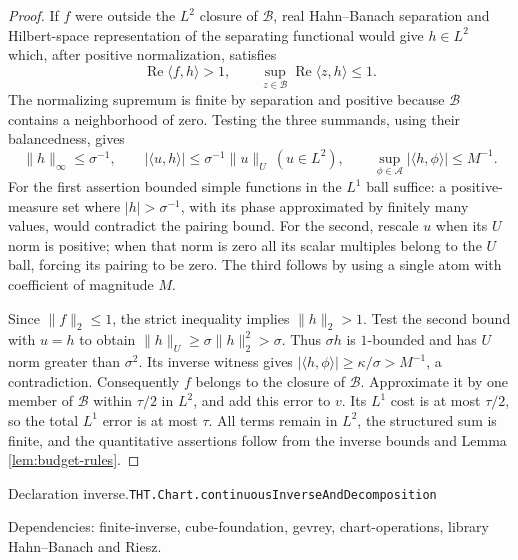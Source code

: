 \documentclass[11pt]{article}
\theoremstyle{definition}
\numberwithin{equation}{section}
\newcommand{\bp}[3]{\par\smallskip\begingroup\footnotesize
\noindent\hypertarget{bp:#1}{\textsf{Declaration #1.}}\quad\nolinkurl{#2}\par
\noindent\textsf{Dependencies:} #3.\par\endgroup\smallskip}
\begin{document}
\begin{proof}
If $f$ were outside the $L^2$ closure of $\mathcal B$, real Hahn--Banach separation and Hilbert-space representation of the separating functional would give $h\in L^2$ which, after positive normalization, satisfies
\[
 \operatorname{Re}\langle f,h\rangle>1,
 \qquad \sup_{z\in\mathcal B}\operatorname{Re}\langle z,h\rangle\le1.
\]
The normalizing supremum is finite by separation and positive because $\mathcal B$ contains a neighborhood of zero. Testing the three summands, using their balancedness, gives
\[
 \|h\|_\infty\le\sigma^{-1},\qquad
 |\langle u,h\rangle|\le\sigma^{-1}\|u\|_U\ (u\in L^2),\qquad
 \sup_{\phi\in\mathcal A}|\langle h,\phi\rangle|\le M^{-1}.
\]
For the first assertion bounded simple functions in the $L^1$ ball suffice: a positive-measure set where $|h|>\sigma^{-1}$, with its phase approximated by finitely many values, would contradict the pairing bound. For the second, rescale $u$ when its $U$ norm is positive; when that norm is zero all its scalar multiples belong to the $U$ ball, forcing its pairing to be zero. The third follows by using a single atom with coefficient of magnitude $M$.

Since $\|f\|_2\le1$, the strict inequality implies $\|h\|_2>1$. Test the second bound with $u=h$ to obtain $\|h\|_U\ge\sigma\|h\|_2^2>\sigma$. Thus $\sigma h$ is $1$-bounded and has $U$ norm greater than $\sigma^2$. Its inverse witness gives $|\langle h,\phi\rangle|\ge\kappa/\sigma>M^{-1}$, a contradiction. Consequently $f$ belongs to the closure of $\mathcal B$. Approximate it by one member of $\mathcal B$ within $\tau/2$ in $L^2$, and add this error to $v$. Its $L^1$ cost is at most $\tau/2$, so the total $L^1$ error is at most $\tau$. All terms remain in $L^2$, the structured sum is finite, and the quantitative assertions follow from the inverse bounds and Lemma \ref{lem:budget-rules}.
\end{proof}
\bp{inverse}{THT.Chart.continuousInverseAndDecomposition}{finite-inverse, cube-foundation, gevrey, chart-operations, library Hahn--Banach and Riesz}
\end{document}
